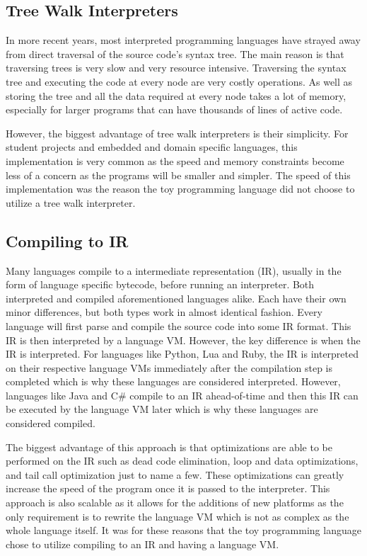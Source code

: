 \documentclass[./subfile.tex]{subfiles}
\begin{document}
        \subsection{Tree Walk Interpreters}
            In more recent years, most interpreted programming languages have strayed away from direct traversal of the source code's syntax tree. The main reason is that traversing trees is very slow and very resource intensive. Traversing the syntax tree and executing the code at every node are very costly operations. As well as storing the tree and all the data required at every node takes a lot of memory, especially for larger programs that can have thousands of lines of active code. 
            
            However, the biggest advantage of tree walk interpreters is their simplicity. For student projects and embedded and domain specific languages, this implementation is very common as the speed and memory constraints become less of a concern as the programs will be smaller and simpler. The speed of this implementation was the reason the toy programming language did not choose to utilize a tree walk interpreter.
        
        \subsection{Compiling to IR}
            Many languages compile to a intermediate representation (IR), usually in the form of language specific bytecode, before running an interpreter. Both interpreted and compiled aforementioned languages alike. Each have their own minor differences, but both types work in almost identical fashion. Every language will first parse and compile the source code into some IR format. This IR is then interpreted by a language VM. However, the key difference is when the IR is interpreted. For languages like Python, Lua and Ruby, the IR is interpreted on their respective language VMs immediately after the compilation step is completed which is why these languages are considered interpreted. However, languages like Java and C\# compile to an IR ahead-of-time and then this IR can be executed by the language VM later which is why these languages are considered compiled.
            
            The biggest advantage of this approach is that optimizations are able to be performed on the IR such as dead code elimination, loop and data optimizations, and tail call optimization just to name a few. These optimizations can greatly increase the speed of the program once it is passed to the interpreter. This approach is also scalable as it allows for the additions of new platforms as the only requirement is to rewrite the language VM which is not as complex as the whole language itself. It was for these reasons that the toy programming language chose to utilize compiling to an IR and having a language VM.
        
\end{document}
